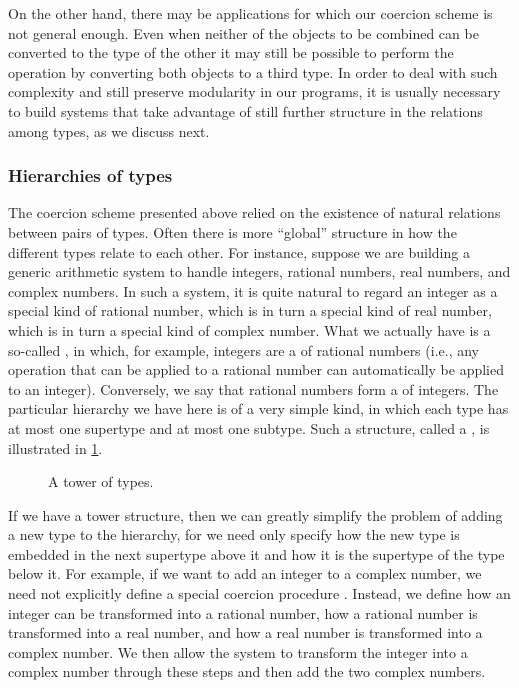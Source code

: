 On the other hand, there may be applications for which our coercion scheme is not general enough.
Even when neither of the objects to be combined can be converted to the type of the other it may still be possible to perform the operation by converting both objects to a third type.
In order to deal with such complexity and still preserve modularity in our programs, it is usually necessary to build systems that take advantage of still further structure in the relations among types, as we discuss next.



\subsubsection*{Hierarchies of types}

The coercion scheme presented above relied on the existence of natural relations between pairs of types.
Often there is more “global” structure in how the different types relate to each other.
For instance, suppose we are building a generic arithmetic system to handle integers, rational numbers, real numbers, and complex numbers.
In such a system, it is quite natural to regard an integer as a special kind of rational number, which is in turn a special kind of real number, which is in turn a special kind of complex number.
What we actually have is a so-called , in which, for example, integers are a  of rational numbers (i.e., any operation that can be applied to a rational number can automatically be applied to an integer).
Conversely, we say that rational numbers form a  of integers.
The particular hierarchy we have here is of a very simple kind, in which each type has at most one supertype and at most one subtype.
Such a structure, called a , is illustrated in \cref{Figure 2.25}.

\begin{figure}[tb]
	\centering
	
	\caption{A tower of types.}
	\label{Figure 2.25}
\end{figure}

If we have a tower structure, then we can greatly simplify the problem of adding a new type to the hierarchy, for we need only specify how the new type is embedded in the next supertype above it and how it is the supertype of the type below it.
For example, if we want to add an integer to a complex number, we need not explicitly define a special coercion procedure .
Instead, we define how an integer can be transformed into a rational number, how a rational number is transformed into a real number, and how a real number is transformed into a complex number.
We then allow the system to transform the integer into a complex number through these steps and then add the two complex numbers.

